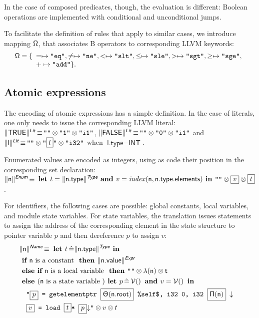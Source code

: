 \documentclass{article}
\newcommand{\trad}[2]{\ensuremath{\lVert \textsf{#1} \rVert^{\textit{#2}}}}
\newcommand{\nl}[0]{\ensuremath{\downarrow}}
\DeclareMathOperator{\isdef}{\equiv}
\DeclareMathOperator{\variable}{\mathcal{V}()}
\newcommand{\llvm}[1]{\texttt{#1}}
\newcommand{\B}[1]{\textsf{#1}}
\newcommand{\IF}[0]{\textbf{ if }}
\newcommand{\ELSIF}[0]{\textbf{ else if }}
\newcommand{\ELSE}[0]{\textbf{ else }}
\newcommand{\THEN}[0]{\textbf{ then }}
\newcommand{\LET}[0]{\textbf{ let }}
\DeclareMathOperator{\BE}{\hat{=}}
\newcommand{\IN}[0]{\textbf{ in }}
\newcommand{\AND}[0]{\textbf{ and }}
\newcommand{\PH}[1]{\framebox{$#1$}}
\newcommand{\sep}[0]{\otimes}
\newcommand{\local}[0]{\ensuremath{\sf\lambda}}
\newcommand{\opmap}[0]{\ensuremath{\sf\Omega}}
\newcommand{\idx}[0]{\ensuremath{\sf\Pi}}
\newcommand{\state}[0]{\ensuremath{\sf\Theta}}
\newcommand{\self}[0]{\llvm{\%self\$}}
\begin{document}
In the case of composed predicates, though, the evaluation is
different: Boolean operations are implemented with conditional and
unconditional jumps.

To facilitate the definition of rules that apply to similar cases, we introduce
mapping $\opmap$, that associates B operators to corresponding LLVM keywords:
$$\opmap = \{
\begin{array}[t]{l}
  = \mapsto \llvm{"eq"},
  \ne \mapsto \llvm{"ne"},
  < \mapsto \llvm{"slt"},
  \le \mapsto \llvm{"sle"},
  > \mapsto \llvm{"sgt"},
  \ge \mapsto \llvm{"sge"}, \\
  + \mapsto \llvm{"add"} \}.
  \end{array}
$$

\subsection{Atomic expressions} 

The encoding of atomic expressions has a simple definition. In the case of
literals, one only needs to issue the corresponding LLVM literal:
$\trad{TRUE}{\B{Lit}} \isdef \llvm{""} \sep \llvm{"1"} \sep \llvm{"i1"}$,
$\trad{FALSE}{\B{Lit}} \isdef \llvm{""} \sep \llvm{"0"} \sep \llvm{"i1"}$ and
$\trad{l}{\B{Lit}} \isdef \llvm{""} \sep \llvm{"\PH{l}"} \sep \llvm{"i32"}$ when
$\B{l.type} = \B{INT}$.

Enumerated values are encoded as integers, using as code their position in the
corresponding set declaration: $\trad{\B{n}}{\B{Enum}} \isdef \LET t =
\trad{\B{n.type}}{\B{Type}} \AND v = \mathit{index}(\B{n}, \B{n.type.elements})
\IN \llvm{""} \sep \PH{v} \sep \PH{t}$.

For identifiers, the following cases are possible: global constants, local
variables, and module state variables. For state variables, the translation
issues statements to assign the address of the corresponding element in the
state structure to pointer variable $p$ and then dereference $p$ to assign $v$:
\begin{align*}
\lefteqn{\trad{n}{\B{Name}} \isdef \LET t \BE \trad{n.type}{\B{Type}} \IN} \\
& \IF \B{n} \mbox{ is a constant } \THEN \trad{n.value}{\B{Expr}} \\
& \ELSIF \B{n} \mbox{ is a local variable } \THEN
\llvm{""} \sep \local(\B{n}) \sep t \\
& \ELSE (\B{n} \mbox{ is a state variable }) \LET p \BE \variable \AND v = \variable \IN \\
& \quad \llvm{"\PH{p} = getelementptr \PH{\state(\B{n.root})} \self, i32 0, i32 \PH{\idx(\B{n})} \nl} \\
& \quad \llvm{\PH{v} = load \PH{t}* \PH{p}\nl"} \sep v \sep t
\end{align*}
\end{document}

